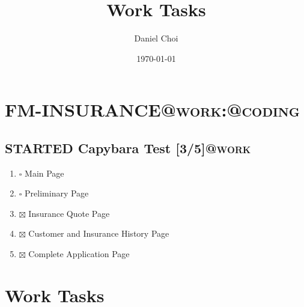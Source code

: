\documentclass[article,letterpaper,times,12pt,listings-bw,microtype]{article}
\author{Daniel Choi}
\date{\today}
\title{Work Tasks}
\begin{document}
\maketitle

\section*{FM-INSURANCE\hfill{}\textsc{@work:@coding}}
\label{sec-1}
\subsection*{{\bfseries\sffamily STARTED} Capybara Test [3/5]\hfill{}\textsc{@work}}
\label{sec-1-1}
\begin{enumerate}
\item $\square$ Main Page
\item $\square$ Preliminary Page
\item $\boxtimes$ Insurance Quote Page
\item $\boxtimes$ Customer and Insurance History Page
\item $\boxtimes$ Complete Application Page
\end{enumerate}

\section*{Work Tasks}
\label{sec-2}
\end{document}
